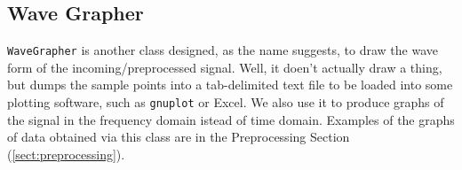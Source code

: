 \subsection{Wave Grapher}

\verb+WaveGrapher+ is another class designed, as the name
suggests, to draw the wave form of the incoming/preprocessed
signal. Well, it doen't actually draw a thing, but dumps
the sample points into a tab-delimited text file to be loaded
into some plotting software, such as \verb+gnuplot+ or Excel. We also
use it to produce graphs of the signal in the frequency domain
istead of time domain. Examples of the graphs of data obtained
via this class are in the Preprocessing Section (\ref{sect:preprocessing}).
